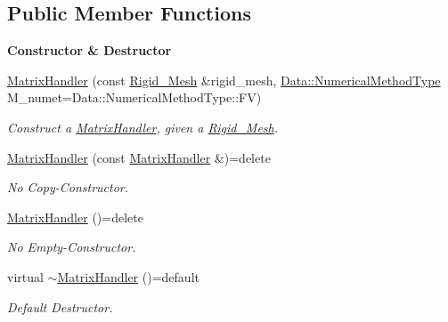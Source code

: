 \subsection*{Public Member Functions}
\begin{Indent}{\bf Constructor \& Destructor}\par
\begin{DoxyCompactItemize}
\item 
\hyperlink{classFVCode3D_1_1MatrixHandler_a74e467c61446d6172111f2ecff45af99}{Matrix\+Handler} (const \hyperlink{classFVCode3D_1_1Rigid__Mesh}{Rigid\+\_\+\+Mesh} \&rigid\+\_\+mesh, \hyperlink{classFVCode3D_1_1Data_a5222e1901276af4586befd821445c6cf}{Data\+::\+Numerical\+Method\+Type} M\+\_\+numet=Data\+::\+Numerical\+Method\+Type\+::\+FV)
\begin{DoxyCompactList}\small\item\em Construct a \hyperlink{classFVCode3D_1_1MatrixHandler}{Matrix\+Handler}, given a \hyperlink{classFVCode3D_1_1Rigid__Mesh}{Rigid\+\_\+\+Mesh}. \end{DoxyCompactList}\item 
\hyperlink{classFVCode3D_1_1MatrixHandler_ae4fc6a88a026df9bafbae27c33019873}{Matrix\+Handler} (const \hyperlink{classFVCode3D_1_1MatrixHandler}{Matrix\+Handler} \&)=delete
\begin{DoxyCompactList}\small\item\em No Copy-\/\+Constructor. \end{DoxyCompactList}\item 
\hyperlink{classFVCode3D_1_1MatrixHandler_a6d5d562bf3903da7f0338f7371336253}{Matrix\+Handler} ()=delete
\begin{DoxyCompactList}\small\item\em No Empty-\/\+Constructor. \end{DoxyCompactList}\item 
virtual \hyperlink{classFVCode3D_1_1MatrixHandler_a2dc118d2c2352c69d2a45e1b84d063c5}{$\sim$\+Matrix\+Handler} ()=default
\begin{DoxyCompactList}\small\item\em Default Destructor. \end{DoxyCompactList}\end{DoxyCompactItemize}
\end{Indent}
